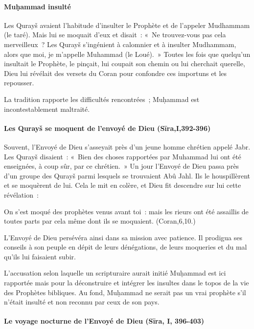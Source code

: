\paragraph{Muḥammad insulté}

{Les Qurayš avaient l'habitude d'insulter le Prophète et de
l'appeler Mudhammam (le taré). Mais lui se moquait d'eux et disait~:
«~Ne trouvez-vous pas cela merveilleux~? Les Qurayš s'ingénient à
calomnier et à insulter Mudhammam, alors que moi, je m'appelle Muhammad
(le Loué).~» Toutes les fois que quelqu'un insultait le Prophète, le
pinçait, lui coupait son chemin ou lui cherchait querelle, Dieu lui
révélait des versets du Coran pour confondre ces importuns et les
repousser.}

La tradition rapporte les difficultés rencontrées~; Muḥammad est
incontestablement maltraité.


\paragraph{Les Qurayš se moquent de l'envoyé de Dieu
(Sīra,I,392-396)~}

{Souvent, l'Envoyé de Dieu s'asseyait près d'un jeune homme
chrétien appelé Jabr. Les Qurayš disaient~: «~Bien des choses rapportées
par Muhammad lui ont été enseignées, à coup sûr, par ce chrétien.~» Un
jour l'Envoyé de Dieu passa près d'un groupe des Qurayš parmi lesquels
se trouvaient Abû Jahl. Ils le houspillèrent et se moquèrent de lui.
Cela le mit en colère, et Dieu fit descendre sur lui cette révélation~:}

{On s'est moqué des prophètes venus avant toi~: mais les rieurs ont
été assaillis de toutes parts par cela même dont ils se moquaient.
(Coran,6,10.)}

{L'Envoyé de Dieu persévéra ainsi dans sa mission avec patience. Il
prodigua ses conseils à son peuple en dépit de leurs dénégations, de
leurs moqueries et du mal qu'ils lui faisaient subir.}

L'accusation selon laquelle un scripturaire aurait initié Muḥammad est
ici rapportée mais pour la déconstruire et intégrer les insultes dans le
topos de la vie des Prophètes bibliques. Au fond, Muḥammad ne serait pas
un vrai prophète s'il n'était insulté et non reconnu par ceux de son
pays.


\paragraph{Le voyage nocturne de l'Envoyé de Dieu (Sīra, I,
396-403)}

